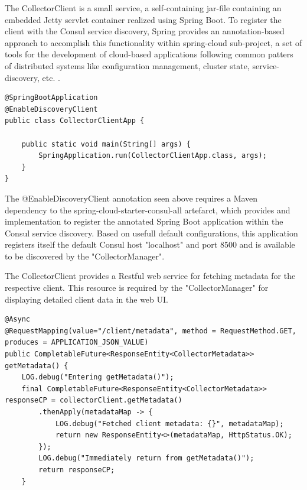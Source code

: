 The CollectorClient is a small service, a self-containing jar-file containing an embedded Jetty servlet container realized using
Spring Boot. To register the client with the Consul service discovery, Spring provides an annotation-based approach to accomplish
this functionality within spring-cloud sub-project, a set of tools for the development of cloud-based applications following common patters
of distributed systems like configuration management, cluster state, service-discovery, etc. .

\begin{lstlisting}[caption={"CollectorClientApp", Client registration}, captionpos=b, label={lst:collector-client-registration}]
@SpringBootApplication
@EnableDiscoveryClient
public class CollectorClientApp {

    public static void main(String[] args) {
        SpringApplication.run(CollectorClientApp.class, args);
    }
}
\end{lstlisting}

The @EnableDiscoveryClient annotation seen above requires a Maven dependency to the spring-cloud-starter-consul-all artefarct,
which provides and implementation to register the annotated Spring Boot application within the Consul service discovery. Based
on usefull default configurations, this application registers itself the default Consul host "localhost" and port 8500 and is
available to be discovered by the "CollectorManager".

The CollectorClient provides a Restful web service for fetching metadata for the respective client. This resource is required by
the "CollectorManager" for displaying detailed client data in the web UI.

\begin{lstlisting}[caption={"ClientMetadataController", Metadata REST endpoint}, captionpos=b, label={lst:metadata-endpoint}]
@Async
@RequestMapping(value="/client/metadata", method = RequestMethod.GET, produces = APPLICATION_JSON_VALUE)
public CompletableFuture<ResponseEntity<CollectorMetadata>> getMetadata() {
    LOG.debug("Entering getMetadata()");
    final CompletableFuture<ResponseEntity<CollectorMetadata>> responseCP = collectorClient.getMetadata()
        .thenApply(metadataMap -> {
            LOG.debug("Fetched client metadata: {}", metadataMap);
            return new ResponseEntity<>(metadataMap, HttpStatus.OK);
        });
        LOG.debug("Immediately return from getMetadata()");
        return responseCP;
    }
\end{lstlisting}

